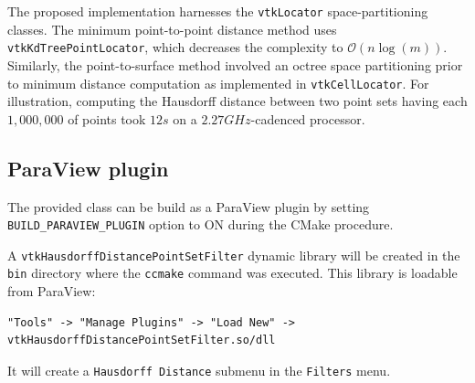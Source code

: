 \documentclass{InsightArticle}
\begin{document}
The proposed implementation harnesses the \verb!vtkLocator! space-partitioning classes. The minimum point-to-point distance method uses \verb!vtkKdTreePointLocator!, which decreases the complexity to $\mathcal{O}(n\log(m))$. Similarly, the point-to-surface method involved an octree space partitioning prior to minimum distance computation as implemented in \verb!vtkCellLocator!. For illustration, computing the Hausdorff distance between two point sets having each $1,000,000$ of points took $12s$ on a $2.27GHz$-cadenced processor.
%
\subsection{ParaView plugin}
%
The provided class can be build as a ParaView plugin by setting \verb!BUILD_PARAVIEW_PLUGIN! option to ON during the CMake procedure.

A \verb!vtkHausdorffDistancePointSetFilter! dynamic library will be created in the \verb!bin! directory where the \verb!ccmake! command was executed. This library is loadable from ParaView:
\begin{verbatim}
"Tools" -> "Manage Plugins" -> "Load New" -> vtkHausdorffDistancePointSetFilter.so/dll
\end{verbatim}
%
It will create a \verb!Hausdorff Distance! submenu in the \verb|Filters| menu.
%
\end{document}
